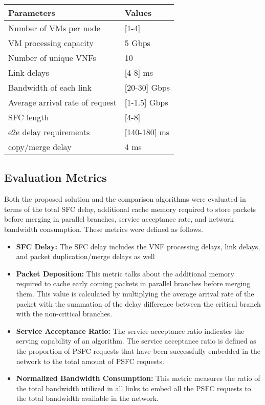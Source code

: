 \documentclass[journal]{IEEEtran}
\begin{document}
\begin{tabular}{|l|l|}\label{param table}\\
\hline
\textbf{Parameters} & \textbf{Values} \\
\hline
Number of VMs per node & [1-4] \\
\hline
VM processing capacity & 5 Gbps \\
\hline
Number of unique VNFs & 10 \\
\hline
Link delays & [4-8] ms \\
\hline
Bandwidth of each link & [20-30] Gbps \\
\hline
Average arrival rate of request & [1-1.5] Gbps \\
\hline
SFC length & [4-8] \\
\hline
e2e delay requirements & [140-180] ms \\
\hline 
copy/merge delay & 4 ms \\
\hline
\end{tabular}
\subsection{Evaluation Metrics}
Both the proposed solution and the comparison algorithms were evaluated
in terms of the total SFC delay, additional cache memory required to store packets before merging in parallel branches, service acceptance rate, and network bandwidth consumption.
These metrics were defined as follows.
\begin{itemize}
    \item \textbf{SFC Delay:} The SFC delay includes the VNF processing delays,
link delays, and packet duplication/merge delays as well
    \item \textbf{Packet Deposition:} This metric talks about the additional memory required to cache early coming packets in parallel branches before merging them. This value is calculated by multiplying the average arrival rate of the packet with the summation of the delay difference between the critical branch with the non-critical branches.
    \item \textbf{Service Acceptance Ratio:} The service acceptance ratio
indicates the serving capability of an algorithm. The
service acceptance ratio is defined as the proportion of
PSFC requests that have been successfully embedded in the network to the total amount of PSFC
requests.
    \item \textbf{Normalized Bandwidth Consumption:} This metric measures the ratio of the total bandwidth utilized in all links to embed all the PSFC requests to the total bandwidth available in the network.
\end{itemize}
\end{document}
